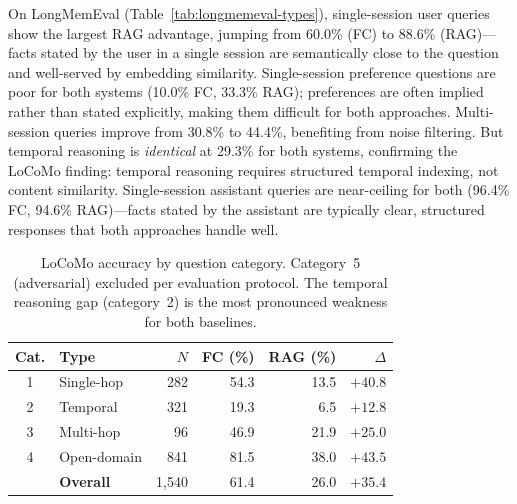 On LongMemEval (Table~\ref{tab:longmemeval-types}), single-session user
queries show the largest RAG advantage, jumping from 60.0\% (FC) to 88.6\%
(RAG)---facts stated by the user in a single session are semantically close
to the question and well-served by embedding similarity.  Single-session
preference questions are poor for both systems (10.0\% FC, 33.3\% RAG);
preferences are often implied rather than stated explicitly, making them
difficult for both approaches.  Multi-session queries improve from 30.8\% to
44.4\%, benefiting from noise filtering.  But temporal reasoning is
\emph{identical} at 29.3\% for both systems, confirming the LoCoMo finding:
temporal reasoning requires structured temporal indexing, not content
similarity.  Single-session assistant queries are near-ceiling for both
(96.4\% FC, 94.6\% RAG)---facts stated by the assistant are typically clear,
structured responses that both approaches handle well.

\begin{table}[!t]
\centering
\caption{LoCoMo accuracy by question category. Category~5 (adversarial)
excluded per evaluation protocol.  The temporal reasoning gap
(category~2) is the most pronounced weakness for both baselines.}
\label{tab:locomo-categories}
\small
\begin{tabular}{@{}clrrrr@{}}
\toprule
\textbf{Cat.} & \textbf{Type} & \textbf{$N$} & \textbf{FC (\%)} & \textbf{RAG (\%)} & \textbf{$\Delta$} \\
\midrule
1 & Single-hop     & 282 & 54.3 & 13.5 & $+40.8$ \\
2 & Temporal        & 321 & 19.3 &  6.5 & $+12.8$ \\
3 & Multi-hop       &  96 & 46.9 & 21.9 & $+25.0$ \\
4 & Open-domain     & 841 & 81.5 & 38.0 & $+43.5$ \\
\midrule
  & \textbf{Overall} & 1{,}540 & 61.4 & 26.0 & $+35.4$ \\
\bottomrule
\end{tabular}
\end{table}

